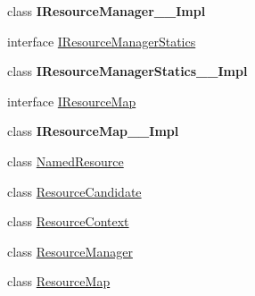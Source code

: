 \begin{DoxyCompactItemize}
\item 
class {\bfseries I\+Resource\+Manager\+\_\+\+\_\+\+Impl}
\item 
interface \hyperlink{interface_windows_1_1_application_model_1_1_resources_1_1_core_1_1_i_resource_manager_statics}{I\+Resource\+Manager\+Statics}
\item 
class {\bfseries I\+Resource\+Manager\+Statics\+\_\+\+\_\+\+Impl}
\item 
interface \hyperlink{interface_windows_1_1_application_model_1_1_resources_1_1_core_1_1_i_resource_map}{I\+Resource\+Map}
\item 
class {\bfseries I\+Resource\+Map\+\_\+\+\_\+\+Impl}
\item 
class \hyperlink{class_windows_1_1_application_model_1_1_resources_1_1_core_1_1_named_resource}{Named\+Resource}
\item 
class \hyperlink{class_windows_1_1_application_model_1_1_resources_1_1_core_1_1_resource_candidate}{Resource\+Candidate}
\item 
class \hyperlink{class_windows_1_1_application_model_1_1_resources_1_1_core_1_1_resource_context}{Resource\+Context}
\item 
class \hyperlink{class_windows_1_1_application_model_1_1_resources_1_1_core_1_1_resource_manager}{Resource\+Manager}
\item 
class \hyperlink{class_windows_1_1_application_model_1_1_resources_1_1_core_1_1_resource_map}{Resource\+Map}
\end{DoxyCompactItemize}
